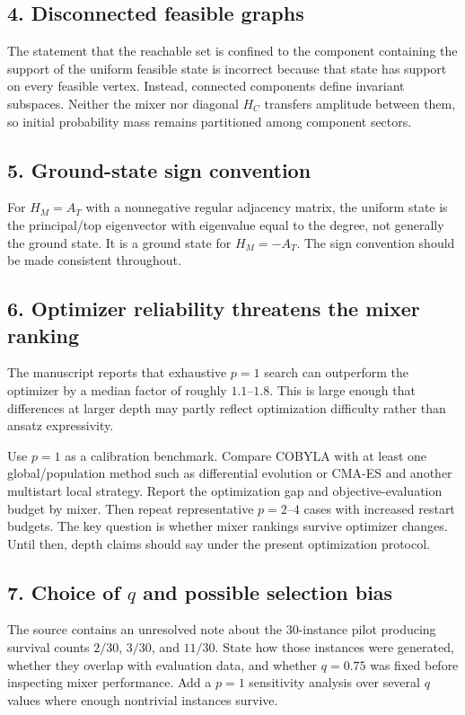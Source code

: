 \documentclass[11pt]{article}
\begin{document}
\subsection*{4. Disconnected feasible graphs}
The statement that the reachable set is confined to the component containing the support of the uniform feasible state is incorrect because that state has support on every feasible vertex. Instead, connected components define invariant subspaces. Neither the mixer nor diagonal $H_C$ transfers amplitude between them, so initial probability mass remains partitioned among component sectors.

\subsection*{5. Ground-state sign convention}
For $H_M=A_T$ with a nonnegative regular adjacency matrix, the uniform state is the principal/top eigenvector with eigenvalue equal to the degree, not generally the ground state. It is a ground state for $H_M=-A_T$. The sign convention should be made consistent throughout.

\subsection*{6. Optimizer reliability threatens the mixer ranking}
The manuscript reports that exhaustive $p=1$ search can outperform the optimizer by a median factor of roughly $1.1$--$1.8$. This is large enough that differences at larger depth may partly reflect optimization difficulty rather than ansatz expressivity.

Use $p=1$ as a calibration benchmark. Compare COBYLA with at least one global/population method such as differential evolution or CMA-ES and another multistart local strategy. Report the optimization gap and objective-evaluation budget by mixer. Then repeat representative $p=2$--$4$ cases with increased restart budgets. The key question is whether mixer rankings survive optimizer changes. Until then, depth claims should say under the present optimization protocol.

\subsection*{7. Choice of $q$ and possible selection bias}
The source contains an unresolved note about the 30-instance pilot producing survival counts $2/30$, $3/30$, and $11/30$. State how those instances were generated, whether they overlap with evaluation data, and whether $q=0.75$ was fixed before inspecting mixer performance. Add a $p=1$ sensitivity analysis over several $q$ values where enough nontrivial instances survive.
\end{document}
